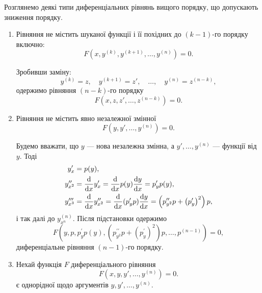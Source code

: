 Розглянемо деякі типи диференціальних рівнянь вищого порядку, що допускають зниження порядку.
\begin{enumerate}
    \item Рівняння не містить шуканої функції і її похідних до $(k-1)$-го порядку включно:
    \begin{equation*}
    	F \left( x, y^{(k)}, y^{(k + 1)}, \ldots, y^{(n)} \right) = 0.
    \end{equation*}
    
    Зробивши заміну:
    \begin{equation*}
    	y^{(k)} = z, \quad y^{(k + 1)} = z', \quad \ldots, \quad y^{(n)} = z^{(n - k)},
    \end{equation*}
    одержимо рівняння $(n-k)$-го порядку
    \begin{equation*}
    	F \left( x, z, z', \ldots, z^{(n - k)} \right) = 0.
    \end{equation*}
    
    \item Рівняння не містить явно незалежної змінної
    \begin{equation*}
    	F \left( y, y', \ldots, y^{(n)} \right) = 0.
    \end{equation*}
    
    Будемо вважати, що $y$ --- нова незалежна змінна, а $y', \ldots, y^{(n)}$ --- функції від $y$. Тоді
    \begin{align*}
    	y_x^\prime &= p(y), \\
    	y_{x^2}^{\prime\prime} &= \frac{\diff}{\diff x}  y_x^\prime = \frac{\diff}{\diff x}  p(y)  \frac{\diff y}{\diff x} = p_y^{\prime}   p(y), \\
    	y_{x^3}^{\prime\prime\prime} &= \frac{\diff}{\diff x}  y_{x^2}^{\prime\prime} = \frac{\diff}{\diff x}  (p_y^\prime p)  \frac{\diff y}{\diff x} = \left( p_{y^2}^{\prime\prime}  p + \left( p_y^\prime \right)^2 \right)  p,
    \end{align*}
    і так далі до $y_{x^n}^{(n)}$. Після підстановки одержимо 
    \begin{equation*}
    	F \left( y, p, p_y^{\prime}   p(y), \left( p_{y^2}^{\prime\prime}  p + \left( p_y^\prime \right)^2 \right)  p, \ldots, p^{(n - 1)} \right) = 0,
    \end{equation*}
    диференціальне рівняння $(n-1)$-го порядку.
    \item Нехай функція $F$ диференціального рівняння
    \begin{equation*}
    	F \left( x, y, y', \ldots, y^{(n)} \right) = 0.
    \end{equation*}
    є однорідної щодо аргументів  $y, y', \ldots, y^{(n)}$. \parvskip
    

\end{enumerate}
